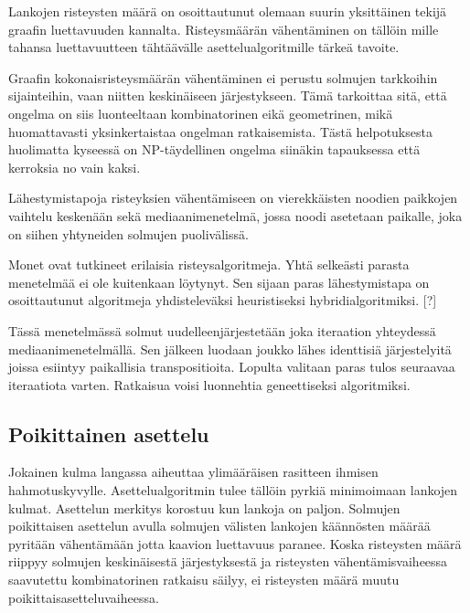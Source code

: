 \documentclass[finnish,12pt]{article}
\begin{document}
Lankojen risteysten määrä on osoittautunut olemaan suurin yksittäinen tekijä graafin luettavuuden kannalta. \cite{RefWorks:47}
Risteysmäärän vähentäminen on tällöin mille tahansa luettavuutteen tähtäävälle asettelualgoritmille tärkeä tavoite.

Graafin kokonaisristeysmäärän vähentäminen ei perustu solmujen tarkkoihin sijainteihin, vaan niitten keskinäiseen järjestykseen. Tämä tarkoittaa sitä, että ongelma on siis luonteeltaan kombinatorinen eikä geometrinen, mikä huomattavasti yksinkertaistaa ongelman ratkaisemista.
Tästä helpotuksesta huolimatta kyseessä on NP-täydellinen ongelma siinäkin tapauksessa että kerroksia no vain kaksi. \cite{RefWorks:40}

Lähestymistapoja risteyksien vähentämiseen on vierekkäisten noodien paikkojen
vaihtelu keskenään sekä mediaanimenetelmä, jossa noodi asetetaan paikalle, joka
on siihen yhtyneiden solmujen puolivälissä.


Monet ovat tutkineet erilaisia risteysalgoritmeja.
Yhtä selkeästi parasta menetelmää ei ole kuitenkaan löytynyt.
Sen sijaan paras lähestymistapa on osoittautunut algoritmeja yhdisteleväksi heuristiseksi hybridialgoritmiksi. [?]

Tässä menetelmässä solmut uudelleenjärjestetään joka iteraation yhteydessä mediaanimenetelmällä.
Sen jälkeen luodaan joukko lähes identtisiä järjestelyitä joissa esiintyy paikallisia transpositioita.
Lopulta valitaan paras tulos seuraavaa iteraatiota varten.
Ratkaisua voisi luonnehtia geneettiseksi algoritmiksi.


		\subsection{Poikittainen asettelu}

Jokainen kulma langassa aiheuttaa ylimääräisen rasitteen ihmisen hahmotuskyvylle. \cite{RefWorks:47} Asettelualgoritmin tulee tällöin pyrkiä minimoimaan lankojen kulmat.
Asettelun merkitys korostuu kun lankoja on paljon.
Solmujen poikittaisen asettelun avulla solmujen välisten lankojen käännösten määrää pyritään vähentämään jotta kaavion luettavuus paranee.
Koska risteysten määrä riippyy solmujen keskinäisestä järjestyksestä ja risteysten vähentämisvaiheessa saavutettu  kombinatorinen ratkaisu säilyy, ei risteysten määrä muutu poikittaisasetteluvaiheessa.
\end{document}
